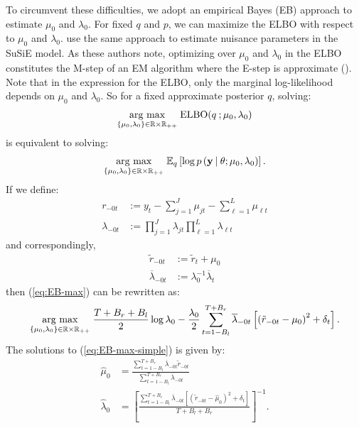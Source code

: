 To circumvent these difficulties, we adopt an empirical Bayes (EB) approach to estimate $\mu_0$ and $\lambda_0$. For fixed $q$ and $p$, we can maximize the ELBO with respect to $\mu_0$ and $\lambda_0$. \cite{Wang20} use the same approach to estimate nuisance parameters in the SuSiE model. As these authors note, optimizing over $\mu_0$ and $\lambda_0$ in the ELBO constitutes the M-step of an EM algorithm where the E-step is approximate (\citealp{Dempster77, Heskes03, Neal98}). Note that in the expression for the ELBO, only the marginal log-likelihood depends on $\mu_0$ and $\lambda_0$. So for a fixed approximate posterior $q$, solving:
\begin{align}
    \underset{\{\mu_0,\lambda_0\}\in\mathbb{R}\times\mathbb{R}_{++}}{\text{\normalfont arg max}} \; \text{ELBO}(q\:;\mu_0,\lambda_0)
\end{align}
is equivalent to solving:
\begin{align}\label{eq:EB-max}
    \underset{\{\mu_0,\lambda_0\}\in\mathbb{R}\times\mathbb{R}_{++}}{\text{\normalfont arg max}} \; \mathbb{E}_{q} \left[\log p\left(\mathbf{y} \:|\: \theta;\mu_0,\lambda_0\right)\right].
\end{align}
If we define:
\begin{align}
    r_{-0t} &:= y_t - \sum_{j=1}^J \mu_{jt} - \sum_{\ell=1}^L \mu_{\ell t} \\
    \lambda_{-0t} &:= \prod_{j=1}^J \lambda_{jt} \prod_{\ell=1}^L \lambda_{\ell t}
\end{align}
and correspondingly,
\begin{align}
    \tilde{r}_{-0t} &:= \tilde{r}_t + \mu_0 \\
    \overline{\lambda}_{-0t} &:= \lambda_0^{-1}\overline{\lambda}_t
\end{align}
then (\ref{eq:EB-max}) can be rewritten as:
\small
\begin{align}\label{eq:EB-max-simple}
    \underset{\{\mu_0,\lambda_0\}\in\mathbb{R}\times\mathbb{R}_{++}}{\text{\normalfont arg max}} \; \frac{T+B_r +B_l}{2}\log\lambda_0 - \frac{\lambda_0}{2}\sum_{t=1-B_l}^{T+B_r} \overline{\lambda}_{-0t}\left[\left(\tilde{r}_{-0t}-\mu_0\right)^2 + \delta_t\right].
\end{align}
\normalsize
The solutions to (\ref{eq:EB-max-simple}) is given by:
\begin{align}
    \hat{\mu}_0 &= \frac{\sum_{t=1-B_l}^{T+B_r} \overline{\lambda}_{-0t}\tilde{r}_{-0t}}{\sum_{t=1-B_l}^{T+B_r} \overline{\lambda}_{-0t}} \label{eq:EB-max-solution-mu} \\
    \hat{\lambda}_0 &= \left[\frac{\sum_{t=1-B_l}^{T+B_r} \overline{\lambda}_{-0t}[\left(\tilde{r}_{-0t}-\hat{\mu}_0\right)^2 + \delta_t]}{T+B_l+B_r}\right]^{-1}. \label{eq:EB-max-solution-lambda}
\end{align}
